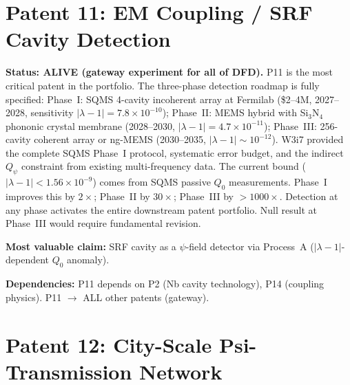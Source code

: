 \documentclass[11pt]{article}
\newcommand{\ee}[1]{\times 10^{#1}}
\newcommand{\lambdaone}{|\lambda{-}1|}
\begin{document}
\section{Patent 11: EM Coupling / SRF Cavity Detection}
\label{sec:P11}

\begin{tcolorbox}[colback=green!5!white, colframe=green!40!black,
  title=\textbf{P11: ALIVE --- Resource Allocation: 5/5 (HIGHEST PRIORITY)}]
\textbf{Status: ALIVE (gateway experiment for all of DFD).}
P11 is the most critical patent in the portfolio. The three-phase
detection roadmap is fully specified:
Phase~I: SQMS 4-cavity incoherent array at Fermilab (\$2--4M,
2027--2028, sensitivity $\lambdaone = 7.8\ee{-10}$);
Phase~II: MEMS hybrid with Si$_3$N$_4$ phononic crystal membrane
(2028--2030, $\lambdaone = 4.7\ee{-11}$);
Phase~III: 256-cavity coherent array or ng-MEMS (2030--2035,
$\lambdaone \sim 10^{-12}$).
W3i7 provided the complete SQMS Phase~I protocol, systematic error
budget, and the indirect $Q_\psi$ constraint from existing multi-frequency
data. The current bound ($\lambdaone < 1.56\ee{-9}$) comes from SQMS
passive $Q_0$ measurements. Phase~I improves this by $2\times$; Phase~II
by $30\times$; Phase~III by $>1000\times$. Detection at any phase
activates the entire downstream patent portfolio. Null result at
Phase~III would require fundamental revision.

\textbf{Most valuable claim:} SRF cavity as a $\psi$-field detector
via Process~A ($\lambdaone$-dependent $Q_0$ anomaly).

\textbf{Dependencies:} P11 depends on P2 (Nb cavity technology), P14
(coupling physics). P11 $\to$ ALL other patents (gateway).
\end{tcolorbox}

\section{Patent 12: City-Scale Psi-Transmission Network}
\label{sec:P12}
\end{document}
